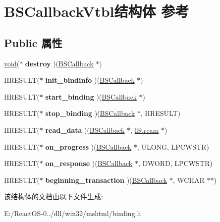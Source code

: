 \hypertarget{struct_b_s_callback_vtbl}{}\section{B\+S\+Callback\+Vtbl结构体 参考}
\label{struct_b_s_callback_vtbl}
\subsection*{Public 属性}
\begin{DoxyCompactItemize}
\item 
\mbox{\label{struct_b_s_callback_vtbl_a97f94e4dbe6b73f9a526faefe1189716}} 
\hyperlink{interfacevoid}{void}($\ast$ {\bfseries destroy} )(\hyperlink{struct_b_s_callback}{B\+S\+Callback} $\ast$)
\item 
\mbox{\label{struct_b_s_callback_vtbl_a6ffc54c160b54529b06450e05ff3bcc6}} 
H\+R\+E\+S\+U\+LT($\ast$ {\bfseries init\+\_\+bindinfo} )(\hyperlink{struct_b_s_callback}{B\+S\+Callback} $\ast$)
\item 
\mbox{\label{struct_b_s_callback_vtbl_aac9dc5bc0be661a601b42c3b48a309b0}} 
H\+R\+E\+S\+U\+LT($\ast$ {\bfseries start\+\_\+binding} )(\hyperlink{struct_b_s_callback}{B\+S\+Callback} $\ast$)
\item 
\mbox{\label{struct_b_s_callback_vtbl_a40ae0fd78a878dea85bebc4d5e30469c}} 
H\+R\+E\+S\+U\+LT($\ast$ {\bfseries stop\+\_\+binding} )(\hyperlink{struct_b_s_callback}{B\+S\+Callback} $\ast$, H\+R\+E\+S\+U\+LT)
\item 
\mbox{\label{struct_b_s_callback_vtbl_a2ac133bbd94d89defbe6e62b78b169dc}} 
H\+R\+E\+S\+U\+LT($\ast$ {\bfseries read\+\_\+data} )(\hyperlink{struct_b_s_callback}{B\+S\+Callback} $\ast$, \hyperlink{interface_i_stream}{I\+Stream} $\ast$)
\item 
\mbox{\label{struct_b_s_callback_vtbl_a6f3229c9b2d6dedc18d678483bf5a544}} 
H\+R\+E\+S\+U\+LT($\ast$ {\bfseries on\+\_\+progress} )(\hyperlink{struct_b_s_callback}{B\+S\+Callback} $\ast$, U\+L\+O\+NG, L\+P\+C\+W\+S\+TR)
\item 
\mbox{\label{struct_b_s_callback_vtbl_af8002dd0cbef5ab3f693c96091c7720c}} 
H\+R\+E\+S\+U\+LT($\ast$ {\bfseries on\+\_\+response} )(\hyperlink{struct_b_s_callback}{B\+S\+Callback} $\ast$, D\+W\+O\+RD, L\+P\+C\+W\+S\+TR)
\item 
\mbox{\label{struct_b_s_callback_vtbl_ad0336619772abb5909fa63ab4b40629d}} 
H\+R\+E\+S\+U\+LT($\ast$ {\bfseries beginning\+\_\+transaction} )(\hyperlink{struct_b_s_callback}{B\+S\+Callback} $\ast$, W\+C\+H\+AR $\ast$$\ast$)
\end{DoxyCompactItemize}


该结构体的文档由以下文件生成\+:\begin{DoxyCompactItemize}
\item 
E\+:/\+React\+O\+S-\/0../dll/win32/mshtml/binding.\+h\end{DoxyCompactItemize}
